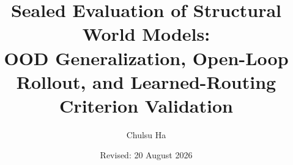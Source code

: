 \documentclass[11pt]{article}
\title{Sealed Evaluation of Structural World Models:\\
OOD Generalization, Open-Loop Rollout, and Learned-Routing Criterion Validation}
\author{Chulsu Ha}
\date{Revised: 20 August 2026}
\theoremstyle{definition}
\begin{document}
\maketitle













\begingroup
\raggedright


\endgroup
\end{document}
